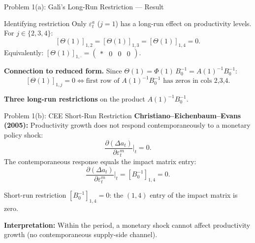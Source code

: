 \documentclass[aspectratio=169,11pt]{beamer}
\begin{document}
\begin{frame}{Problem 1(a): Gal\'{\i}'s Long-Run Restriction --- Result}
    \begin{alertblock}{Identifying restriction}
        Only $\varepsilon_t^a$ ($j=1$) has a long-run effect on productivity levels. For $j \in \{2,3,4\}$:
        \[
        [\Theta(1)]_{1,2} = [\Theta(1)]_{1,3} = [\Theta(1)]_{1,4} = 0.
        \]
        Equivalently: $[\Theta(1)]_{1,\cdot} = \begin{pmatrix} * & 0 & 0 & 0 \end{pmatrix}$.
    \end{alertblock}

    \vspace{0.3em}
    \textbf{Connection to reduced form.} Since $\Theta(1) = \Phi(1)\,B_0^{-1} = A(1)^{-1} B_0^{-1}$:
    \[
    [\Theta(1)]_{1,j} = 0 \iff \text{first row of } A(1)^{-1}B_0^{-1} \text{ has zeros in cols 2,3,4.}
    \]

    \vspace{0.2em}
    \textbf{Three long-run restrictions} on the product $A(1)^{-1} B_0^{-1}$.
\end{frame}

\begin{frame}{Problem 1(b): CEE Short-Run Restriction}
    \textbf{Christiano--Eichenbaum--Evans (2005):} Productivity growth does not respond contemporaneously to a monetary policy shock:
    \[
    \frac{\partial(\Delta a_t)}{\partial \varepsilon_t^m}\bigg|_t = 0.
    \]
    The contemporaneous response equals the impact matrix entry:
    \[
    \frac{\partial(\Delta a_t)}{\partial \varepsilon_t^m}\bigg|_t = [B_0^{-1}]_{1,4} = 0.
    \]

    \begin{alertblock}{Short-run restriction}
        $[B_0^{-1}]_{1,4} = 0$: the $(1,4)$ entry of the impact matrix is zero.
    \end{alertblock}

    \textbf{Interpretation:} Within the period, a monetary shock cannot affect productivity growth (no contemporaneous supply-side channel).
\end{frame}
\end{document}
